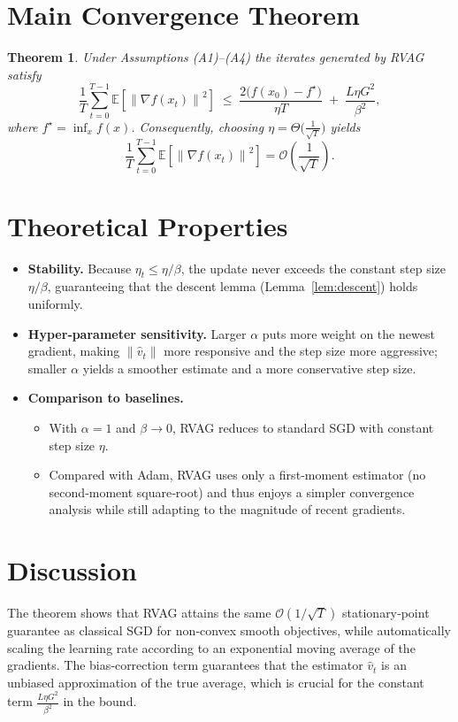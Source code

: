 \documentclass{article}
\newtheorem{theorem}{Theorem}
\newcommand{\EE}{\mathbb{E}}
\newcommand{\norm}[1]{\left\lVert#1\right\rVert}
\begin{document}
\section*{Main Convergence Theorem}
\begin{theorem}
\label{thm:main}
Under Assumptions (A1)–(A4) the iterates generated by RVAG satisfy
\[
\frac{1}{T}\sum_{t=0}^{T-1}\EE\!\left[\norm{\nabla f(x_t)}^2\right]
\;\le\;
\frac{2\bigl(f(x_0)-f^\star\bigr)}{\eta T}
\;+\;
\frac{L\eta G^2}{\beta^2},
\]
where $f^\star=\inf_{x}f(x)$. Consequently, choosing $\eta =\Theta\!\bigl(\tfrac{1}{\sqrt{T}}\bigr)$ yields
\[
\frac{1}{T}\sum_{t=0}^{T-1}\EE\!\left[\norm{\nabla f(x_t)}^2\right]=\mathcal{O}\!\left(\frac{1}{\sqrt{T}}\right).
\]
\end{theorem}

\section*{Theoretical Properties}
\begin{itemize}
    \item \textbf{Stability.} Because $\eta_t\le \eta/\beta$, the update never exceeds the constant step size $\eta/\beta$, guaranteeing that the descent lemma (Lemma~\ref{lem:descent}) holds uniformly.
    \item \textbf{Hyper‑parameter sensitivity.} Larger $\alpha$ puts more weight on the newest gradient, making $\norm{\hat v_t}$ more responsive and the step size more aggressive; smaller $\alpha$ yields a smoother estimate and a more conservative step size.
    \item \textbf{Comparison to baselines.}
    \begin{itemize}
        \item With $\alpha=1$ and $\beta\to0$, RVAG reduces to standard SGD with constant step size $\eta$.
        \item Compared with Adam, RVAG uses only a first‑moment estimator (no second‑moment square‑root) and thus enjoys a simpler convergence analysis while still adapting to the magnitude of recent gradients.
    \end{itemize}
\end{itemize}

\section*{Discussion}
The theorem shows that RVAG attains the same $\mathcal{O}(1/\sqrt{T})$ stationary‑point guarantee as classical SGD for non‑convex smooth objectives, while automatically scaling the learning rate according to an exponential moving average of the gradients. The bias‑correction term guarantees that the estimator $\hat v_t$ is an unbiased approximation of the true average, which is crucial for the constant term $\tfrac{L\eta G^2}{\beta^2}$ in the bound.
\end{document}
